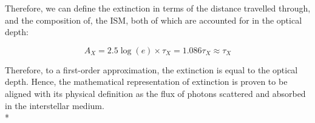 Therefore, we can define the extinction in terms of the distance travelled through, and the composition of, the ISM, both of which are accounted for in the optical depth:

\begin{equation}
A_{X} = 2.5\log(e) \times \tau_{X} = 1.086\tau_{X} \approx \tau_{X}
\label{flux_loss_optical_depth}
\end{equation}

Therefore, to a first-order approximation, the extinction is equal to the optical depth. Hence, the mathematical representation of extinction is proven to be aligned with its physical definition as the flux of photons scattered and absorbed in the interstellar medium. \\*